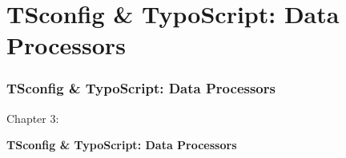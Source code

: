 %

\section{TSconfig \& TypoScript: Data Processors}
\begin{frame}[fragile]
	\frametitle{TSconfig \& TypoScript: Data Processors}

	\begin{center}\huge{Chapter 3:}\end{center}
	\begin{center}\huge{\color{typo3darkgrey}\textbf{TSconfig \& TypoScript: Data Processors}}\end{center}

\end{frame}


